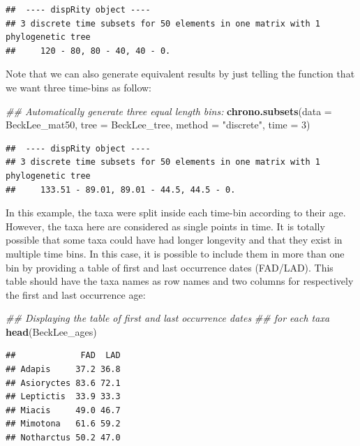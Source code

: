 \documentclass[]{book}
\newenvironment{Shaded}{\begin{snugshade}}{\end{snugshade}}
\newcommand{\CommentTok}[1]{\textcolor[rgb]{0.56,0.35,0.01}{\textit{#1}}}
\newcommand{\DataTypeTok}[1]{\textcolor[rgb]{0.13,0.29,0.53}{#1}}
\newcommand{\DecValTok}[1]{\textcolor[rgb]{0.00,0.00,0.81}{#1}}
\newcommand{\KeywordTok}[1]{\textcolor[rgb]{0.13,0.29,0.53}{\textbf{#1}}}
\newcommand{\NormalTok}[1]{#1}
\newcommand{\StringTok}[1]{\textcolor[rgb]{0.31,0.60,0.02}{#1}}
\begin{document}
\begin{verbatim}
##  ---- dispRity object ---- 
## 3 discrete time subsets for 50 elements in one matrix with 1 phylogenetic tree
##     120 - 80, 80 - 40, 40 - 0.
\end{verbatim}

Note that we can also generate equivalent results by just telling the function that we want three time-bins as follow:

\begin{Shaded}
\begin{Highlighting}[]
\CommentTok{## Automatically generate three equal length bins:}
\KeywordTok{chrono.subsets}\NormalTok{(}\DataTypeTok{data =}\NormalTok{ BeckLee_mat50, }\DataTypeTok{tree =}\NormalTok{ BeckLee_tree,}
               \DataTypeTok{method =} \StringTok{"discrete"}\NormalTok{,}
               \DataTypeTok{time =} \DecValTok{3}\NormalTok{)}
\end{Highlighting}
\end{Shaded}

\begin{verbatim}
##  ---- dispRity object ---- 
## 3 discrete time subsets for 50 elements in one matrix with 1 phylogenetic tree
##     133.51 - 89.01, 89.01 - 44.5, 44.5 - 0.
\end{verbatim}

In this example, the taxa were split inside each time-bin according to their age.
However, the taxa here are considered as single points in time.
It is totally possible that some taxa could have had longer longevity and that they exist in multiple time bins.
In this case, it is possible to include them in more than one bin by providing a table of first and last occurrence dates (FAD/LAD).
This table should have the taxa names as row names and two columns for respectively the first and last occurrence age:

\begin{Shaded}
\begin{Highlighting}[]
\CommentTok{## Displaying the table of first and last occurrence dates}
\CommentTok{## for each taxa}
\KeywordTok{head}\NormalTok{(BeckLee_ages)}
\end{Highlighting}
\end{Shaded}

\begin{verbatim}
##             FAD  LAD
## Adapis     37.2 36.8
## Asioryctes 83.6 72.1
## Leptictis  33.9 33.3
## Miacis     49.0 46.7
## Mimotona   61.6 59.2
## Notharctus 50.2 47.0
\end{verbatim}
\end{document}
